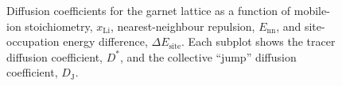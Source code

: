 \documentclass[aps,prb,twocolumn,superscriptaddress,reprint]{revtex4-1}
\newcommand{\xLi}{x_\m{Li}}
\newcommand{\m}[1]{\mathrm{#1}}
\begin{document}
\begin{figure}[tb]
  \centering
    \caption{\label{fig:diffusion_miniplots}Diffusion coefficients for the garnet lattice as a function of mobile-ion stoichiometry, $\xLi$, nearest-neighbour repulsion, $E_\m{nn}$, and site-occupation energy difference, $\Delta E_\m{site}$. Each subplot shows the tracer diffusion coefficient, $D^*$, and the collective ``jump'' diffusion coefficient, $D_\m{J}$.}
\end{figure}
\end{document}
